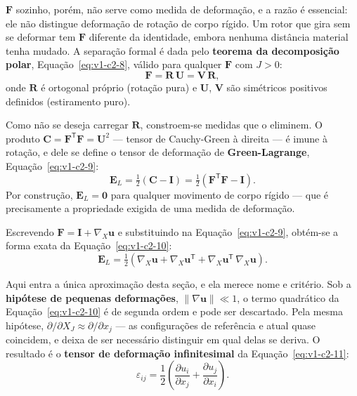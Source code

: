 \documentclass[12pt,a4paper]{article}
\numberwithin{equation}{section}
\numberwithin{table}{section}
\numberwithin{figure}{section}
\begin{document}
$\mathbf{F}$ sozinho, porém, não serve como medida de deformação, e a razão é
essencial: ele não distingue deformação de rotação de corpo rígido. Um rotor
que gira sem se deformar tem $\mathbf{F}$ diferente da identidade, embora
nenhuma distância material tenha mudado. A separação formal é dada pelo
\textbf{teorema da decomposição polar}, Equação~\eqref{eq:v1-c2-8}, válido para
qualquer $\mathbf{F}$ com $J>0$:
\begin{equation}\label{eq:v1-c2-8}
\mathbf{F} = \mathbf{R}\,\mathbf{U} = \mathbf{V}\,\mathbf{R},
\end{equation}
onde $\mathbf{R}$ é ortogonal próprio (rotação pura) e $\mathbf{U}$,
$\mathbf{V}$ são simétricos positivos definidos (estiramento puro).

Como não se deseja carregar $\mathbf{R}$, constroem-se medidas que o eliminem.
O produto $\mathbf{C} = \mathbf{F}^{\mathsf{T}}\mathbf{F} = \mathbf{U}^2$
--- tensor de Cauchy-Green à direita --- é imune à rotação, e dele se define o
tensor de deformação de \textbf{Green-Lagrange}, Equação~\eqref{eq:v1-c2-9}:
\begin{equation}\label{eq:v1-c2-9}
\mathbf{E}_L = \tfrac{1}{2}\left(\mathbf{C} - \mathbf{I}\right)
= \tfrac{1}{2}\left(\mathbf{F}^{\mathsf{T}}\mathbf{F} - \mathbf{I}\right).
\end{equation}
Por construção, $\mathbf{E}_L = \mathbf{0}$ para qualquer movimento de corpo
rígido --- que é precisamente a propriedade exigida de uma medida de
deformação.

Escrevendo $\mathbf{F} = \mathbf{I} + \nabla_{\!X}\mathbf{u}$ e substituindo na
Equação~\eqref{eq:v1-c2-9}, obtém-se a forma exata da
Equação~\eqref{eq:v1-c2-10}:
\begin{equation}\label{eq:v1-c2-10}
\mathbf{E}_L = \tfrac{1}{2}\left( \nabla_{\!X}\mathbf{u} +
\nabla_{\!X}\mathbf{u}^{\mathsf{T}} +
\nabla_{\!X}\mathbf{u}^{\mathsf{T}}\,\nabla_{\!X}\mathbf{u} \right).
\end{equation}

Aqui entra a única aproximação desta seção, e ela merece nome e critério.
Sob a \textbf{hipótese de pequenas deformações}, $\|\nabla\mathbf{u}\| \ll 1$,
o termo quadrático da Equação~\eqref{eq:v1-c2-10} é de segunda ordem e pode ser
descartado. Pela mesma hipótese, $\partial/\partial X_J \approx \partial/\partial
x_j$ --- as configurações de referência e atual quase coincidem, e deixa de ser
necessário distinguir em qual delas se deriva. O resultado é o \textbf{tensor
de deformação infinitesimal} da Equação~\eqref{eq:v1-c2-11}:
\begin{equation}\label{eq:v1-c2-11}
\varepsilon_{ij} = \frac{1}{2}\left( \frac{\partial u_i}{\partial x_j} +
\frac{\partial u_j}{\partial x_i} \right).
\end{equation}
\end{document}
